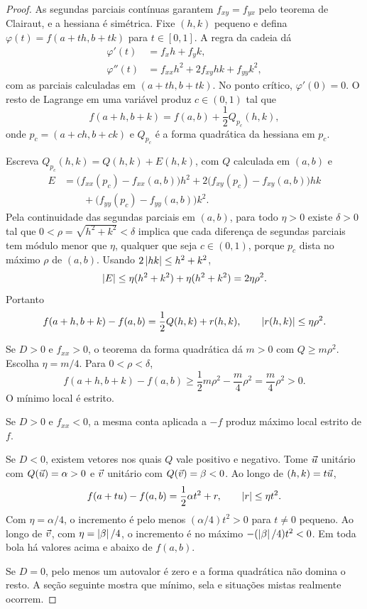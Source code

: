 \documentclass[11pt,a4paper]{article}
\begin{document}
\begin{proof}
As segundas parciais contínuas garantem $f_{xy}=f_{yx}$ pelo teorema de Clairaut, e a hessiana é simétrica. Fixe $(h,k)$ pequeno e defina $\varphi(t)=f(a+th,b+tk)$ para $t\in[0,1]$. A regra da cadeia dá
\begin{align*}
\varphi'(t)&=f_x h+f_y k,\\
\varphi''(t)&=f_{xx}h^2+2f_{xy}hk+f_{yy}k^2,
\end{align*}
com as parciais calculadas em $(a+th,b+tk)$. No ponto crítico, $\varphi'(0)=0$. O resto de Lagrange em uma variável produz $c\in(0,1)$ tal que
\[
f(a+h,b+k)=f(a,b)+\frac12 Q_{p_c}(h,k),
\]
onde $p_c=(a+ch,b+ck)$ e $Q_{p_c}$ é a forma quadrática da hessiana em $p_c$.

Escreva $Q_{p_c}(h,k)=Q(h,k)+E(h,k)$, com $Q$ calculada em $(a,b)$ e
\begin{align*}
E&=
\bigl(f_{xx}(p_c)-f_{xx}(a,b)\bigr)h^2
+2\bigl(f_{xy}(p_c)-f_{xy}(a,b)\bigr)hk\\
&\qquad+\bigl(f_{yy}(p_c)-f_{yy}(a,b)\bigr)k^2.
\end{align*}
Pela continuidade das segundas parciais em $(a,b)$, para todo $\eta>0$ existe $\delta>0$ tal que $0<\rho=\sqrt{h^2+k^2}<\delta$ implica que cada diferença de segundas parciais tem módulo menor que $\eta$, qualquer que seja $c\in(0,1)$, porque $p_c$ dista no máximo $\rho$ de $(a,b)$. Usando $2\left\lvert hk \right\rvert\le h^2+k^2$,
\[
\left\lvert E \right\rvert\le\eta(h^2+k^2)+\eta(h^2+k^2)=2\eta\rho^2.
\]
Portanto
\[
f(a+h,b+k)-f(a,b)=\frac12 Q(h,k)+r(h,k),\qquad \left\lvert r(h,k) \right\rvert\le\eta\rho^2.
\]

Se $D>0$ e $f_{xx}>0$, o teorema da forma quadrática dá $m>0$ com $Q\ge m\rho^2$. Escolha $\eta=m/4$. Para $0<\rho<\delta$,
\[
f(a+h,b+k)-f(a,b)\ge\frac12 m\rho^2-\frac{m}{4}\rho^2=\frac{m}{4}\rho^2>0.
\]
O mínimo local é estrito.

Se $D>0$ e $f_{xx}<0$, a mesma conta aplicada a $-f$ produz máximo local estrito de $f$.

Se $D<0$, existem vetores nos quais $Q$ vale positivo e negativo. Tome $\vec{u}$ unitário com $Q(\vec{u})=\alpha>0$ e $\vec{v}$ unitário com $Q(\vec{v})=\beta<0$. Ao longo de $(h,k)=t\vec{u}$,
\[
f(a+tu)-f(a,b)=\frac12\alpha t^2+r,\qquad \left\lvert r \right\rvert\le\eta t^2.
\]
Com $\eta=\alpha/4$, o incremento é pelo menos $(\alpha/4)t^2>0$ para $t\neq 0$ pequeno. Ao longo de $\vec{v}$, com $\eta=\left\lvert \beta \right\rvert/4$, o incremento é no máximo $-(\left\lvert \beta \right\rvert/4)t^2<0$. Em toda bola há valores acima e abaixo de $f(a,b)$.

Se $D=0$, pelo menos um autovalor é zero e a forma quadrática não domina o resto. A seção seguinte mostra que mínimo, sela e situações mistas realmente ocorrem.
\end{proof}
\end{document}

